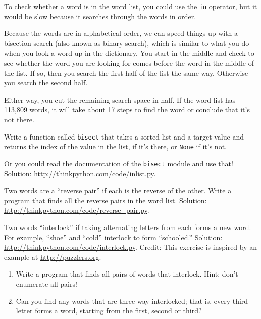 \documentclass[10pt]{book}
\begin{document}
\begin{exercise}
\label{wordlist1}
\label{bisection}

To check whether a word is in the word list, you could use
the {\tt in} operator, but it would be slow because it searches
through the words in order.

Because the words are in alphabetical order, we can speed things up
with a bisection search (also known as binary search), which is
similar to what you do when you look a word up in the dictionary.  You
start in the middle and check to see whether the word you are looking
for comes before the word in the middle of the list.  If so, then you
search the first half of the list the same way.  Otherwise you search
the second half.

Either way, you cut the remaining search space in half.  If the
word list has 113,809 words, it will take about 17 steps to
find the word or conclude that it's not there.

Write a function called {\tt bisect} that takes a sorted list
and a target value and returns the index of the value
in the list, if it's there, or {\tt None} if it's not.

Or you could read the documentation of the {\tt bisect} module
and use that!  Solution: \url{http://thinkpython.com/code/inlist.py}.

\end{exercise}

\begin{exercise}

Two words are a ``reverse pair'' if each is the reverse of the
other.  Write a program that finds all the reverse pairs in the
word list.  Solution: \url{http://thinkpython.com/code/reverse_pair.py}.

\end{exercise}

\begin{exercise}

Two words ``interlock'' if taking alternating letters from each forms
a new word.  For example, ``shoe'' and ``cold''
interlock to form ``schooled.''
Solution: \url{http://thinkpython.com/code/interlock.py}.
Credit: This exercise is inspired by an example at \url{http://puzzlers.org}.

\begin{enumerate}

\item Write a program that finds all pairs of words that interlock.
  Hint: don't enumerate all pairs!

\item Can you find any words that are three-way interlocked; that is,
  every third letter forms a word, starting from the first, second or
  third?

\end{enumerate}
\end{exercise}
\end{document}
